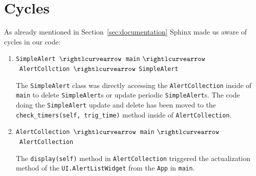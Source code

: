 \section{Cycles}
\label{sec:cycles}

As already mentioned in Section~\ref{sec:documentation} Sphinx made us aware of
cycles in our code:

\begin{enumerate}

    \item \texttt{SimpleAlert}~$\rightlcurvearrow$~\texttt{main}
        $\rightlcurvearrow$~\texttt{AlertCollction}~$\rightlcurvearrow$
        \texttt{SimpleAlert}

        The \texttt{SimpleAlert} class was directly accessing
        the \texttt{AlertCollection} inside of \texttt{main} to
        delete \texttt{SimpleAlert}s or update periodic \texttt{SimpleAlert}s.
        The code doing the \texttt{SimpleAlert} update and delete has been moved
        to the \texttt{check\_timers(self, trig\_time)} method inside of
        \texttt{AlertCollection}.

    \item \texttt{AlertCollection}~$\rightlcurvearrow$~\texttt{main}
        $\rightlcurvearrow$~\texttt{AlertCollection}

        The \texttt{display(self)} method in \texttt{AlertCollection} triggered
        the actualization method of the \texttt{UI.AlertListWidget} from the
        \texttt{App} in \texttt{main}.

\end{enumerate}


